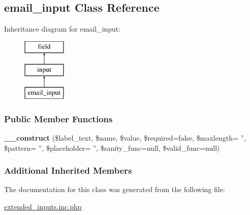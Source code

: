 \hypertarget{classemail__input}{\subsection{email\-\_\-input Class Reference}
\label{classemail__input}
}
Inheritance diagram for email\-\_\-input\-:\begin{figure}[H]
\begin{center}
\leavevmode
\includegraphics[height=3.000000cm]{classemail__input}
\end{center}
\end{figure}
\subsubsection*{Public Member Functions}
\begin{DoxyCompactItemize}
\item 
\hypertarget{classemail__input_ad0fcf81fbddaed253573fe659c84c9ab}{{\bfseries \-\_\-\-\_\-construct} (\$label\-\_\-text, \$name, \$value, \$required=false, \$maxlength= '', \$pattern= '', \$placeholder= '', \$sanity\-\_\-func=null, \$valid\-\_\-func=null)}\label{classemail__input_ad0fcf81fbddaed253573fe659c84c9ab}

\end{DoxyCompactItemize}
\subsubsection*{Additional Inherited Members}


The documentation for this class was generated from the following file\-:\begin{DoxyCompactItemize}
\item 
\hyperlink{extended__inputs_8inc_8php}{extended\-\_\-inputs.\-inc.\-php}\end{DoxyCompactItemize}
